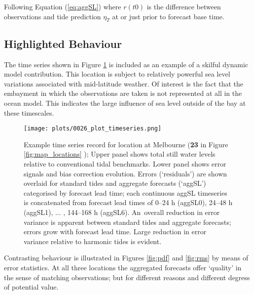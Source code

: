 Following Equation (\ref{eq:aggSL}) where $r(t0)$ is the difference between observations and tide prediction $\eta_{T}$ at or just prior to forecast base time. 

\subsection{Highlighted Behaviour}
The time series shown in Figure \ref{fig:ts_melb} is included as an example of a skilful dynamic model contribution.  
This location is subject to relatively powerful sea level variations associated with mid-latitude weather.
Of interest is the fact that the embayment in which the observations are taken is not represented at all in the ocean model.  This indicates the large influence of sea level outside of the bay at these timescales. 

\begin{figure}[H]
    \centering
    \texttt{[image: plots/0026\_plot\_timeseries.png]}
    \caption{ Example time series record for location at Melbourne (\textbf{23} in Figure \ref{fig:map_locations} ); Upper panel shows total still water levels relative to conventional tidal benchmarks. Lower panel shows error signals and bias correction evolution.  Errors (`residuals') are shown overlaid for standard tides and aggregate forecasts (`aggSL') categorised by forecast lead time;  each continuous aggSL timeseries is concatenated from forecast lead times of 0--24 h (aggSL0), 24--48 h (aggSL1), ... , 144--168 h (aggSL6).  An~overall reduction in error variance is apparent between standard tides and aggregate forecasts; errors grow with forecast lead time.   
    Large reduction in error variance relative to harmonic tides is evident.}
\label{fig:ts_melb}
\end{figure}   


Contrasting behaviour is illustrated in Figures \ref{fig:pdf} and \ref{fig:rms} by means of error statistics.
At all three locations the aggregated forecasts offer `quality' in the sense of matching observations; but for different reasons and different degress of potential value. 

